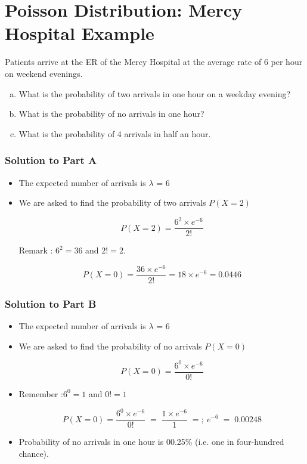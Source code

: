 \documentclass[a4paper,12pt]{article}
\begin{document}
\section*{Poisson Distribution: Mercy Hospital Example}
Patients arrive at the ER of the Mercy Hospital at the average rate of 6 per hour on weekend evenings.
\begin{enumerate}[(a)]
	\item What is the probability of two arrivals in one hour on a weekday evening?
	
	\item What is the probability of no arrivals in one hour?
	\item What is the probability of 4 arrivals in half an hour.
\end{enumerate}

\subsubsection*{Solution to Part A}
\begin{itemize}
\item The expected number of arrivals is $\lambda$ = 6 

\item We are asked to find the probability of two arrivals $P(X=2)$

\[P(X=2) = \frac{6^2 \times e^{-6}}{2!}\] 

Remark : $6^2= 36$ and $2! = 2$.

\[P(X=0) =\frac{36 \times e^{-6}}{2!} = 18 \times e^{-6}  = 0.0446 \]

\end{itemize}


\subsubsection*{Solution to Part B}

\begin{itemize}
\item The expected number of arrivals is $\lambda$ = 6 
	
\item We are asked to find the probability of no arrivals $P(X=0)$
	
	\[P(X=0) = \frac{6^0 \times e^{-6}}{0!}\]
	
\item Remember :$6^0= 1   $  and  $0! = 1$
	
	\[P(X=0) = \frac{6^0 \times e^{-6}}{0!} \;=\; \frac{1 \times e^{-6} }{1}\;=;\ e^{-6} \; = \; 0.00248\]
	
\item Probability of no arrivals in one hour is 00.25\% (i.e. one in four-hundred chance).
	
\end{itemize}
\end{document}
